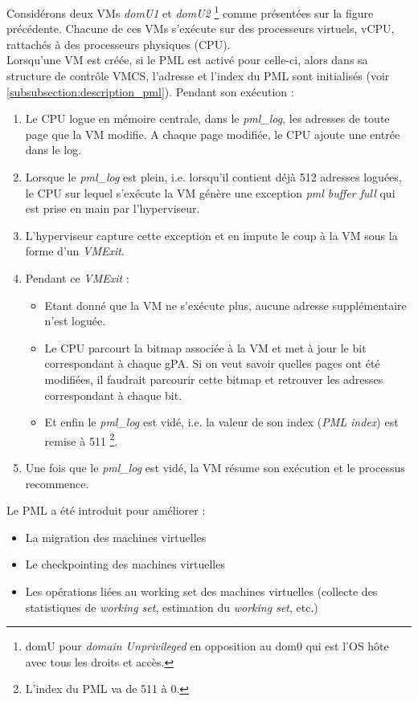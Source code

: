 \noindent Considérons deux VMs \textit{domU1} et \textit{domU2} \footnote{domU pour \textit{domain Unprivileged} en opposition au dom0 qui est l'OS hôte avec tous les droits et accès.} comme présentées sur la figure précédente. Chacune de ces VMs s'exécute sur des processeurs virtuels, \ac{vCPU}, rattachés à des processeurs physiques (\acs{CPU}).\\
Lorsqu'une VM est créée, si le PML est activé pour celle-ci, alors dans sa structure de contrôle \ac{VMCS}, l'adresse et l'index du PML sont initialisés (voir \ref{subsubsection:description_pml}). Pendant son exécution :

\begin{enumerate}[label=\textbf{(\roman*)}]
    \item Le CPU logue en mémoire centrale, dans le \textit{pml\_log}, les adresses de toute page que la VM modifie. A chaque page modifiée, le CPU ajoute une entrée dans le log.
    \item Lorsque le \textit{pml\_log} est plein, i.e. lorsqu'il contient déjà 512 adresses loguées, le CPU sur lequel s'exécute la VM génère une exception \textit{pml buffer full} qui est prise en main par l'hyperviseur.
    \item L'hyperviseur capture cette exception et en impute le coup à la VM sous la forme d'un \textit{VMExit}.
    \item Pendant ce \textit{VMExit} :
    
        \begin{itemize}
            \item Etant donné que la VM ne s'exécute plus, aucune adresse supplémentaire n'est loguée.
            \item Le CPU parcourt la bitmap associée à la VM et met à jour le bit correspondant à chaque gPA. Si on veut savoir quelles pages ont été modifiées, il faudrait parcourir cette bitmap et retrouver les adresses correspondant à chaque bit.
            \item Et enfin le \textit{pml\_log} est vidé, i.e. la valeur de son index (\textit{PML index}) est remise à 511 \footnote{L'index du PML va de 511 à 0.}. 
        \end{itemize}
    
    \item Une fois que le \textit{pml\_log} est vidé, la VM résume son exécution et le processus recommence.
\end{enumerate}

\noindent Le PML a été introduit pour améliorer :
\begin{itemize}
    \item La migration des machines virtuelles
    \item Le checkpointing \cite{checkpointing} des machines virtuelles
    \item Les opérations liées au working set des machines virtuelles (collecte des statistiques de \textit{working set}, estimation du \textit{working set}, etc.)
\end{itemize}

